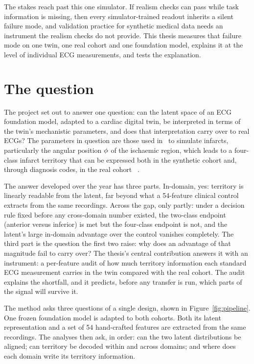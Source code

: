 The stakes reach past this one simulator. If realism checks can pass while task information is missing, then every simulator-trained readout inherits a silent failure mode, and validation practice for synthetic medical data needs an instrument the realism checks do not provide. This thesis measures that failure mode on one twin, one real cohort and one foundation model, explains it at the level of individual ECG measurements, and tests the explanation.

\section{The question}
\label{sec:intro-question}

The project set out to answer one question: can the latent space of an ECG foundation model, adapted to a cardiac digital twin, be interpreted in terms of the twin's mechanistic parameters, and does that interpretation carry over to real ECGs? The parameters in question are those used in \medalcare\ to simulate infarcts, particularly the angular position $\phi$ of the ischaemic region, which leads to a four-class infarct territory that can be expressed both in the synthetic cohort and, through diagnosis codes, in the real cohort \ptbxl\ \citep{wagner2020ptbxl}.

The answer developed over the year has three parts. In-domain, yes: territory is linearly readable from the latent, far beyond what a 54-feature clinical control extracts from the same recordings. Across the gap, only partly: under a decision rule fixed before any cross-domain number existed, the two-class endpoint (anterior versus inferior) is met but the four-class endpoint is not, and the latent's large in-domain advantage over the control vanishes completely. The third part is the question the first two raise: why does an advantage of that magnitude fail to carry over? The thesis's central contribution answers it with an instrument: a per-feature audit of how much territory information each standard ECG measurement carries in the twin compared with the real cohort. The audit explains the shortfall, and it predicts, before any transfer is run, which parts of the signal will survive it.

The method asks three questions of a single design, shown in Figure~\ref{fig:pipeline}. One frozen foundation model is adapted to both cohorts. Both its latent representation and a set of 54 hand-crafted features are extracted from the same recordings. The analyses then ask, in order: can the two latent distributions be aligned; can territory be decoded within and across domains; and where does each domain write its territory information.

